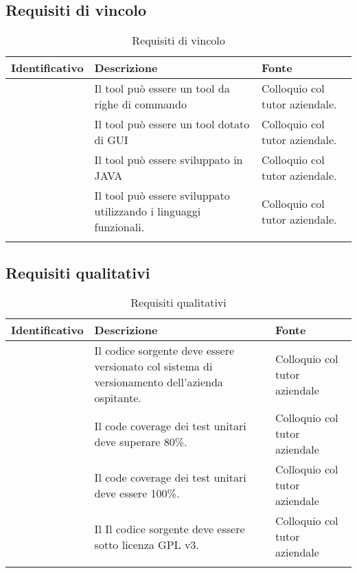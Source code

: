 \subsection{Requisiti di vincolo}\label{subsec:requisiti-vincolo}
\renewcommand{\arraystretch}{1.5}
\begin{center}
    \begin{longtable}{ | c| C{7cm} |C{3cm} |}
        \hline
        \textbf{Identificativo} & \textbf{Descrizione} &\textbf{Fonte}\\\hline
         &Il tool può essere un tool da righe di commando & Colloquio col tutor aziendale.\\\hline
         &Il tool può essere un tool dotato di GUI & Colloquio col tutor aziendale.\\\hline
         &Il tool può essere sviluppato in JAVA & Colloquio col tutor aziendale.\\\hline
         &Il tool può essere sviluppato utilizzando i linguaggi funzionali.& Colloquio col tutor aziendale.\\\hline
        \caption{Requisiti di vincolo}
    \end{longtable}
\end{center}
\setcounter{rowcount}{0}

\subsection{Requisiti qualitativi}\label{subsec:requisiti-qualitativi}
\renewcommand{\arraystretch}{1.5}
\begin{center}
    \begin{longtable}{ | c| C{7cm} |C{3cm} |}
        \hline
        \textbf{Identificativo} & \textbf{Descrizione} &\textbf{Fonte}\\\hline
        &Il codice sorgente deve essere versionato col sistema di versionamento dell'azienda ospitante. &Colloquio col tutor aziendale \\\hline
        &Il code coverage dei test unitari deve superare 80\%.& Colloquio col tutor aziendale\\\hline
        &Il code coverage dei test unitari deve essere 100\%.& Colloquio col tutor aziendale\\\hline
        &Il Il codice sorgente deve essere sotto licenza GPL v3.& Colloquio col tutor aziendale\\\hline
        \caption{Requisiti qualitativi}
    \end{longtable}
\end{center}
\setcounter{subCount}{0}
\setcounter{rowcount}{0}